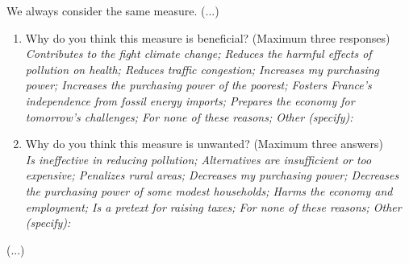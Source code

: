 \documentclass[english,5p,authoryear]{elsarticle}
\begin{document}
\begin{appendices}
We always consider the same measure. (...)
\begin{enumerate}[resume,leftmargin=*]
\item Why do you think this measure is beneficial? (Maximum three responses)
\textit{}\\
\textit{Contributes to the fight climate change; Reduces the harmful
effects of pollution on health; Reduces traffic congestion; Increases
my purchasing power; Increases the purchasing power of the poorest;
Fosters France's independence from fossil energy imports; Prepares
the economy for tomorrow's challenges; For none of these reasons;
Other (specify): }
\item Why do you think this measure is unwanted? (Maximum three answers)
\textit{}\\
\textit{Is ineffective in reducing pollution; Alternatives are insufficient
or too expensive; Penalizes rural areas; Decreases my purchasing power;
Decreases the purchasing power of some modest households; Harms the
economy and employment; Is a pretext for raising taxes; For none of
these reasons; Other (specify):} 
\end{enumerate}
(...)


\end{appendices}
\end{document}
